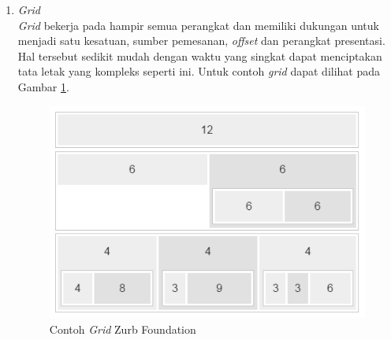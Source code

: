 \begin{enumerate}[(1)]
\item {\it Grid}\\
{\it Grid} bekerja pada hampir semua perangkat dan memiliki dukungan untuk menjadi satu kesatuan, sumber pemesanan, {\it offset} dan perangkat presentasi. Hal tersebut sedikit mudah dengan waktu yang singkat dapat menciptakan tata letak yang kompleks seperti ini. Untuk contoh {\it grid} dapat dilihat pada Gambar \ref{fig:grid}.

\begin{figure}[H]
\centering
\includegraphics[scale=0.7]{Gambar/grid.png}
\caption[Contoh {\it Grid} Zurb Foundation]{Contoh {\it Grid} Zurb Foundation}
\label{fig:grid}
\end{figure}


\end{enumerate}
